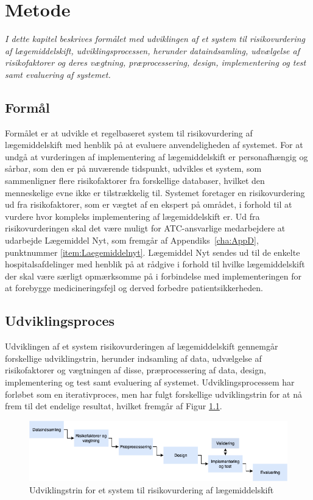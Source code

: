 \chapter{Metode}
\textit{I dette kapitel beskrives formålet med udviklingen af et system til risikovurdering af lægemiddelskift, udviklingsprocessen, herunder dataindsamling, udvælgelse af risikofaktorer og deres vægtning, præprocessering, design, implementering og test samt evaluering af systemet.}

\section{Formål}
Formålet er at udvikle et regelbaseret system til risikovurdering af lægemiddelskift med henblik på at evaluere anvendeligheden af systemet. For at undgå at vurderingen af implementering af lægemiddelskift er personafhængig og sårbar, som den er på nuværende tidspunkt, udvikles et system, som sammenligner flere risikofaktorer fra forskellige databaser, hvilket den menneskelige evne ikke er tilstrækkelig til. Systemet foretager en risikovurdering ud fra risikofaktorer, som er vægtet af en ekspert på området, i forhold til at vurdere hvor kompleks implementering af lægemiddelskift er. Ud fra risikovurderingen skal det være muligt for ATC-ansvarlige medarbejdere at udarbejde Lægemiddel Nyt, som fremgår af Appendiks~\ref{cha:AppD}, punktnummer \ref{item:Laegemiddelnyt}. Lægemiddel Nyt sendes ud til de enkelte hospitalsafdelinger med henblik på at rådgive i forhold til hvilke lægemiddelskift der skal være særligt opmærksomme på i forbindelse med implementeringen for at forebygge medicineringsfejl og derved forbedre patientsikkerheden. 

\section{Udviklingsproces}
Udviklingen af et system risikovurderingen af lægemiddelskift gennemgår forskellige udviklingstrin, herunder indsamling af data, udvælgelse af risikofaktorer og vægtningen af disse, præprocessering af data, design, implementering og test samt evaluering af systemet. Udviklingsprocessem har forløbet som en iterativproces, men har fulgt forskellige udviklingstrin for at nå frem til det endelige resultat, hvilket fremgår af Figur \ref{fig:metode}. 

\begin{figure}[H]\centering	\includegraphics[width=1\textwidth]{billeder/udviklingstrin.png} 
	\caption{Udviklingstrin for et system til risikovurdering af lægemiddelskift}
	\label{fig:metode}  
\end{figure}
\vspace{-0.5cm}


